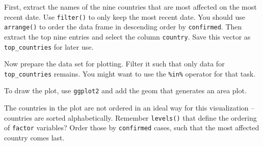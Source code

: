 \documentclass[
  11pt,
]{article}
\newenvironment{tips}[1]
  {
  \begin{itemize}
  \footnotesize
  \renewcommand{\labelitemi}{
    \raisebox{-.7\height}[0pt][0pt]{
      {\setkeys{Gin}{width=3em,keepaspectratio}
        \texttt{[image: images/\#1.png]}}
    }
  }
  \setlength{\fboxsep}{1em}
  \begin{rbox}
  \item
  }
  {
  \end{rbox}
  \end{itemize}
  }
\begin{document}
\begin{tips}r

First, extract the names of the nine countries that are most affected on the most recent date. Use \texttt{filter()} to only keep the most recent date. You should use \texttt{arrange()} to order the data frame in descending order by \texttt{confirmed}. Then extract the top nine entries and select the column \texttt{country}. Save this vector as \texttt{top\_countries} for later use.

Now prepare the data set for plotting. Filter it such that only data for \texttt{top\_countries} remains. You might want to use the \texttt{\%in\%} operator for that task.

To draw the plot, use \texttt{ggplot2} and add the geom that generates an area plot.

The countries in the plot are not ordered in an ideal way for this visualization -- countries are sorted alphabetically. Remember \texttt{levels()} that define the ordering of \texttt{factor} variables? Order those by \texttt{confirmed} cases, such that the most affected country comes last.

\end{tips}
\end{document}

